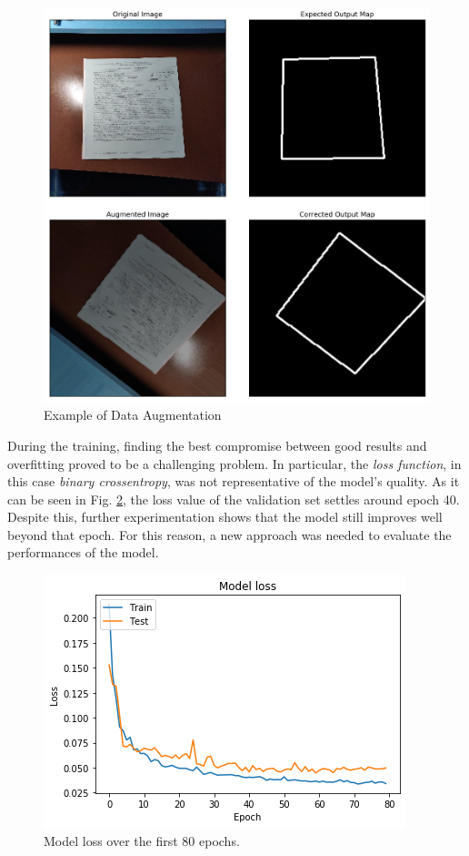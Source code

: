 \documentclass[a4paper]{article}
\begin{document}
\begin{figure}[H]
	\includegraphics[width=\linewidth]{augmented_image.png}
	\caption{Example of Data Augmentation}
	\label{fig:augmented_image}
\end{figure}

During the training, finding the best compromise between good results and overfitting proved to be a challenging problem. In particular, the \textit{loss function}, in this case \textit{binary crossentropy}, 
was not representative of the model's quality. As it can be seen in Fig. \ref{fig:model_loss}, the loss value of the validation set settles around epoch 40. Despite this, further experimentation shows that the model still improves well beyond that epoch. For this reason, a new approach was needed to evaluate the performances of the model.

\begin{figure}[htb!]
	\centering
	\includegraphics[width=0.7\linewidth]{model_loss.png}
	\caption{Model loss over the first 80 epochs.}
	\label{fig:model_loss}
\end{figure}
\end{document}
